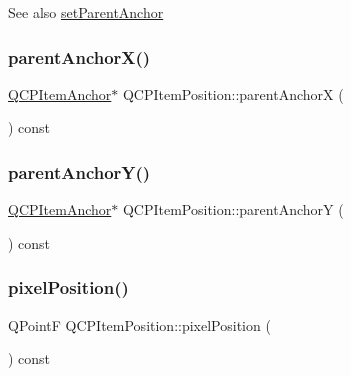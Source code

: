 \begin{DoxySeeAlso}{See also}
\mbox{\hyperlink{class_q_c_p_item_position_ac094d67a95d2dceafa0d50b9db3a7e51}{set\+Parent\+Anchor}} 
\end{DoxySeeAlso}
\mbox{\label{class_q_c_p_item_position_a605cb8b2cf6044d3d03cb1a894faf98a}} 
\subsubsection{\texorpdfstring{parentAnchorX()}{parentAnchorX()}}
{\footnotesize\ttfamily \mbox{\hyperlink{class_q_c_p_item_anchor}{Q\+C\+P\+Item\+Anchor}}$\ast$ Q\+C\+P\+Item\+Position\+::parent\+AnchorX (\begin{DoxyParamCaption}{ }\end{DoxyParamCaption}) const\hspace{0.3cm}{\ttfamily [inline]}}

\mbox{\label{class_q_c_p_item_position_aa40afec791a4339b09572922ca425ec2}} 
\subsubsection{\texorpdfstring{parentAnchorY()}{parentAnchorY()}}
{\footnotesize\ttfamily \mbox{\hyperlink{class_q_c_p_item_anchor}{Q\+C\+P\+Item\+Anchor}}$\ast$ Q\+C\+P\+Item\+Position\+::parent\+AnchorY (\begin{DoxyParamCaption}{ }\end{DoxyParamCaption}) const\hspace{0.3cm}{\ttfamily [inline]}}

\mbox{\label{class_q_c_p_item_position_a8be9a4787635433edecc75164beb748d}} 
\subsubsection{\texorpdfstring{pixelPosition()}{pixelPosition()}}
{\footnotesize\ttfamily Q\+PointF Q\+C\+P\+Item\+Position\+::pixel\+Position (\begin{DoxyParamCaption}{ }\end{DoxyParamCaption}) const\hspace{0.3cm}{\ttfamily [virtual]}}

